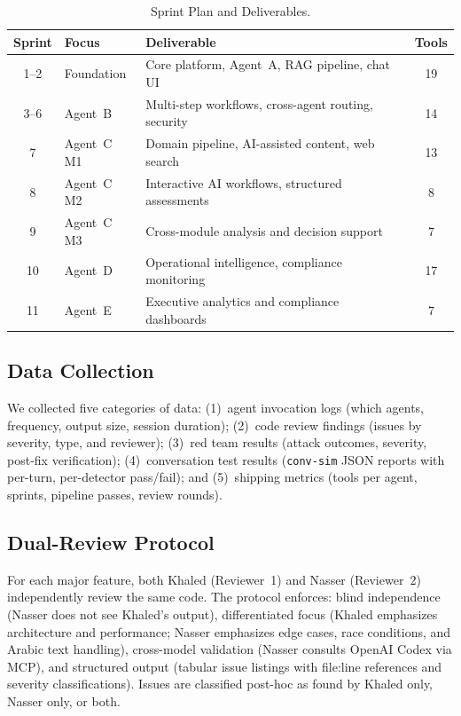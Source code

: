 \documentclass[a4paper,USenglish,cleveref,autoref]{lipics-v2021}
\begin{document}
\begin{table}[t]
\caption{Sprint Plan and Deliverables.}
\label{tab:sprintplan}
\centering
\footnotesize
\begin{tabular}{@{}clp{4.5cm}c@{}}
\toprule
\textbf{Sprint} & \textbf{Focus} & \textbf{Deliverable} & \textbf{Tools} \\
\midrule
1--2 & Foundation & Core platform, Agent~A, RAG pipeline, chat UI & 19 \\
3--6 & Agent~B & Multi-step workflows, cross-agent routing, security & 14 \\
7 & Agent~C M1 & Domain pipeline, AI-assisted content, web search & 13 \\
8 & Agent~C M2 & Interactive AI workflows, structured assessments & 8 \\
9 & Agent~C M3 & Cross-module analysis and decision support & 7 \\
10 & Agent~D & Operational intelligence, compliance monitoring & 17 \\
11 & Agent~E & Executive analytics and compliance dashboards & 7 \\
\bottomrule
\end{tabular}
\end{table}

\subsection{Data Collection}

We collected five categories of data: (1)~agent invocation logs (which agents, frequency, output size, session duration); (2)~code review findings (issues by severity, type, and reviewer); (3)~red team results (attack outcomes, severity, post-fix verification); (4)~conversation test results (\texttt{conv-sim} JSON reports with per-turn, per-detector pass/fail); and (5)~shipping metrics (tools per agent, sprints, pipeline passes, review rounds).

\subsection{Dual-Review Protocol}
\label{sec:dualprotocol}

For each major feature, both Khaled (Reviewer~1) and Nasser (Reviewer~2) independently review the same code. The protocol enforces: blind independence (Nasser does not see Khaled's output), differentiated focus (Khaled emphasizes architecture and performance; Nasser emphasizes edge cases, race conditions, and Arabic text handling), cross-model validation (Nasser consults OpenAI Codex via MCP), and structured output (tabular issue listings with file:line references and severity classifications). Issues are classified post-hoc as found by Khaled only, Nasser only, or both.
\end{document}
